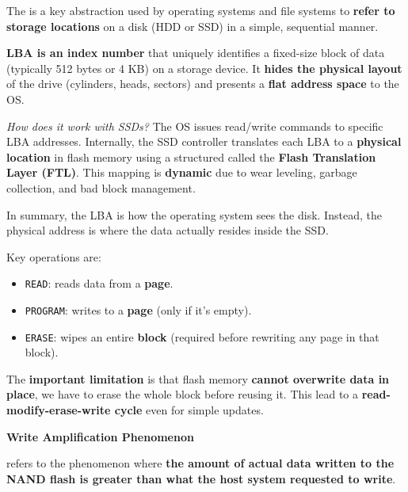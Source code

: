 \highspace
\begin{deepeningbox}
    The  is a key abstraction used by operating systems and file systems to \textbf{refer to storage locations} on a disk (HDD or SSD) in a simple, sequential manner.

    \highspace
    \textbf{LBA is an index number} that uniquely identifies a fixed-size block of data (typically 512 bytes or 4 KB) on a storage device. It \textbf{hides the physical layout} of the drive (cylinders, heads, sectors) and presents a \textbf{flat address space} to the OS.

    \highspace
    \emph{How does it work with SSDs?} The OS issues read/write commands to specific LBA addresses. Internally, the SSD controller translates each LBA to a \textbf{physical location} in flash memory using a structured called the \textbf{Flash Translation Layer (FTL)}. This mapping is \textbf{dynamic} due to wear leveling, garbage collection, and bad block management.

    \highspace
    In summary, the LBA is how the operating system sees the disk. Instead, the physical address is where the data actually resides inside the SSD.
\end{deepeningbox}

\noindent
Key operations are:
\begin{itemize}
    \item \texttt{READ}: reads data from a \textbf{page}.
    \item \texttt{PROGRAM}: writes to a \textbf{page} (only if it's empty).
    \item \texttt{ERASE}: wipes an entire \textbf{block} (required before rewriting any page in that block).
\end{itemize}
The \textbf{important limitation} is that flash memory \textbf{cannot overwrite data in place}, we have to erase the whole block before reusing it. This lead to a \textbf{read-modify-erase-write cycle} even for simple updates.


\highspace
\begin{flushleft}
    \textcolor{Red2}{ \textbf{Write Amplification Phenomenon}}
\end{flushleft}\label{Write amplification (WA)}
 refers to the phenomenon where \textbf{the amount of actual data written to the NAND flash is greater than what the host system requested to write}.

